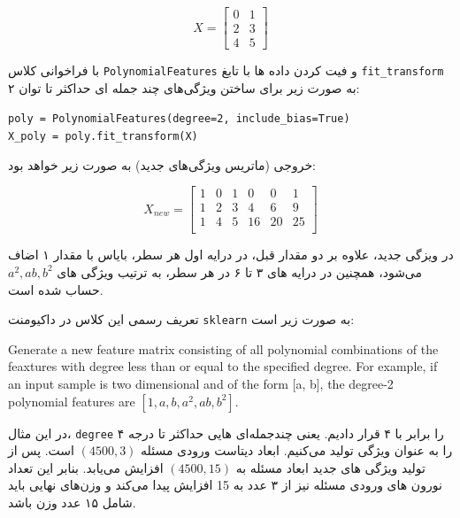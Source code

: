 \begin{enumerate}
\begin{qsolve}
		$$
		X=\begin{bmatrix} 
			0 & 1 \\ 
			2 & 3 \\ 
			4 & 5 
		\end{bmatrix}
		$$
		
		با فراخوانی کلاس \texttt{PolynomialFeatures} و فیت کردن داده ها با تابغ \texttt{fit\_transform} به صورت زیر برای ساختن ویژگی‌های چند جمله ای حداکثر تا توان ۲:
		
		\begin{latin}
			\texttt{poly = PolynomialFeatures(degree=2, include\_bias=True)}\\
			\texttt{X\_poly = poly.fit\_transform(X)}
		\end{latin}
		
		خروجی (ماتریس ویژگی‌های جدید) به صورت زیر خواهد بود:
	\end{qsolve}
	
	
	
	
	
	\begin{qsolve}
		$$
		X_{new}=\begin{bmatrix} 
			1 & 0 & 1 & 0 & 0 & 1\\
			1 & 2 & 3 & 4 & 6 & 9\\ 
			1 & 4 & 5 & 16 & 20 & 25\\ 
		\end{bmatrix}
		$$
		
		در ويزگی جدید، علاوه بر دو مقدار قبل، در درایه اول هر سطر، بایاس با مقدار ۱ اضاف می‌شود، همچنین در درایه های ۳ تا ۶ در هر سطر، به ترتیب ویژگی های $a^2,ab,b^2$ حساب شده است.
		
		تعریف رسمی این کلاس در داکیومنت \texttt{sklearn} به صورت زیر است:
		
		\begin{latin}
			Generate a new feature matrix consisting of all polynomial combinations
			of the feaxtures with degree less than or equal to the specified degree.
			For example, if an input sample is two dimensional and of the form
			[a, b], the degree-2 polynomial features are $[1, a, b, a^2, ab, b^2]$.
		\end{latin}
		
		
		در این مثال، \texttt{degree} را برابر با ۴ قرار دادیم. یعنی چندجمله‌ای هایی حداکثر تا درجه ۴ را به عنوان ویژگی تولید می‌کنیم. ابعاد دیتاست ورودی مسئله $(4500, 3)$ است. پس از تولید ویژگی های جدید ابعاد مسئله به $(4500, 15)$ افزایش می‌یابد. بنابر این تعداد نورون های ورودی مسئله نیز از ۳ عدد به 15 افزایش پیدا می‌کند و وزن‌های نهایی باید شامل ۱۵ عدد وزن باشد.
		

\end{qsolve}
\end{enumerate}
